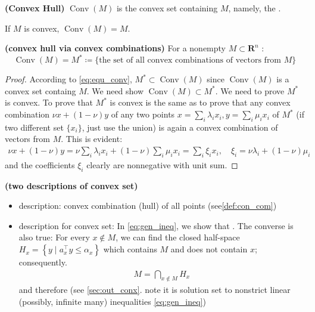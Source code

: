 \documentclass{article}
\newcommand{\bfs}[1]{\textbf{({#1}) }}
\begin{document}
\begin{defa}{\bfs{Convex Hull}} 
 $\operatorname{Conv}(M)$  is the  convex set containing $M$, namely, the .
\end{defa}
\begin{rema}
If $M$ is convex, $\operatorname{Conv}(M)=M$.
\end{rema}
\begin{cora}{\bfs{convex hull via convex combinations}}\label{eq:con_conx_com}
For a nonempty $M \subset \mathbf{R}^{n}$ :
$$\operatorname{Conv}(M)=M^{*}\coloneqq\{ \text{the set of all convex combinations of vectors from } M\} $$
\end{cora}
\begin{proof}\color{ForestGreen}
According to \cref{eq:equ_conv}, $M^{*}\subset \operatorname{Conv}(M)$ since $\operatorname{Conv}(M)$ is a convex set containg $M$. We need show $\operatorname{Conv}(M)\subset M^{*}$. We need to prove  $M^{*}$ is convex. To prove that $M^{*}$ is convex is the same as to prove that any convex combination $\nu x+(1-\nu) y$ of any two points $x=\sum_{i} \lambda_{i} x_{i}, y=\sum_{i} \mu_{i} x_{i}$ of $M^{*}$ (if two different set $\{x_i\}$, just use the union) is again a convex combination of vectors from $M$. This is evident:
\begin{align*}
\nu x+(1-\nu) y=\nu \sum_{i} \lambda_{i} x_{i}+(1-\nu) \sum_{i} \mu_{i} x_{i}=\sum_{i} \xi_{i} x_{i}, \quad \xi_{i}=\nu \lambda_{i}+(1-\nu) \mu_{i}
\end{align*}
and the coefficients $\xi_{i}$ clearly are nonnegative with unit sum. 
\end{proof}



\begin{rema}{\bfs{two descriptions of convex set}}\label{rema:two_des}
\begin{itemize}
    \item {} description: convex combination (hull) of all points (see\cref{def:con_com})
    \item {} description for  convex set: 
 In \cref{eq:gen_ineq}, we show that . The converse is also true:  For every $x \notin M$, we can find the closed half-space $H_{x}=\left\{y \mid a_{x}^{\top} y \leq \alpha_{x}\right\}$ which contains $M$ and does not contain $x$; consequently.
\begin{align*}
M=\bigcap_{x \notin M} H_{x}
\end{align*}
and therefore  (see \cref{sec:out_conx}. note it is solution set to nonstrict linear (possibly, infinite many) inequalities  \cref{eq:gen_ineq})
\end{itemize}
\end{rema}
\end{document}
